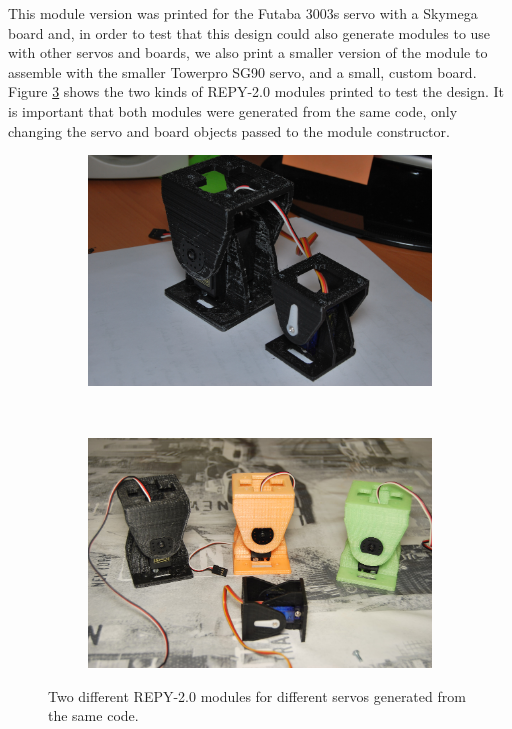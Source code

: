 This module version was printed for the Futaba 3003s servo with a Skymega board and, in order to test that this design could also generate modules to use with other servos and boards, we also print a smaller version of the module to assemble with the smaller Towerpro SG90 servo, and a small, custom board. Figure \ref{fig:hardware_repy2_big_and_small} shows the two kinds of REPY-2.0 modules printed to test the design. It is important that both modules were generated from the same code, only changing the servo and board objects passed to the module constructor.\\

\begin{figure}[H]
		\centering
        \begin{subfigure}[b]{0.45\textwidth}
                \centering
                \includegraphics[width=\textwidth]{images/Hardware_repy2_big_and_small_01.jpg}
                \label{fig:hardware_repy2_big_and_small_01}
        \end{subfigure}
        ~
        \begin{subfigure}[b]{0.45\textwidth}
                \centering
                \includegraphics[width=\textwidth]{images/Hardware_repy2_big_and_small_02.jpg}
                \label{fig:hardware_repy2_big_and_small_02}
        \end{subfigure}
        \caption{Two different REPY-2.0 modules for different servos generated from the same code. } \label{fig:hardware_repy2_big_and_small}
\end{figure}


